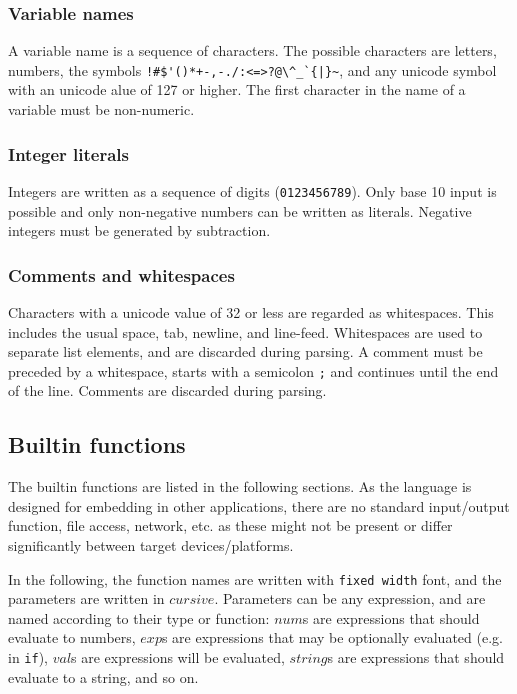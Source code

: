 \documentclass[11pt]{report}
\begin{document}
\subsubsection{Variable names}
A variable name is a sequence of characters. The possible characters are letters, numbers, the symbols \verb"!#$'()*+-,-./:<=>?@\^_`{|}~", and any unicode symbol with an unicode alue of 127 or higher. The first character in the name of a variable must be non-numeric.

\subsubsection{Integer literals}

Integers are written as a sequence of digits (\verb|0123456789|). Only base 10 input is possible and only non-negative numbers can be written as literals. Negative integers must be generated by subtraction.

\subsubsection{Comments and whitespaces}
Characters with a unicode value of 32 or less are regarded as whitespaces. This includes the usual space, tab, newline, and line-feed. Whitespaces are used to separate list elements, and are discarded during parsing. A comment must be preceded by a whitespace, starts with a semicolon \verb|;| and continues until the end of the line. Comments are discarded during parsing.

\subsection{Builtin functions}
The builtin functions are listed in the following sections. As the language is designed for embedding in other applications, there are no standard input/output function, file access, network, etc. as these might not be present or differ significantly between target devices/platforms.

In the following, the function names are written with {\tt fixed width} font, and the parameters are written in $cursive$. Parameters can be any expression, and are named according to their type or function: $num$s are expressions that should evaluate to numbers, $exp$s are expressions that may be optionally evaluated (e.g. in {\tt if}), $val$s are expressions will be evaluated, $string$s are expressions that should evaluate to a string, and so on.
\end{document}
